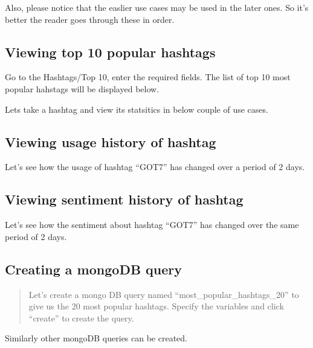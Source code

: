 \documentclass[letterpaper,10pt,english]{sphinxmanual}
\begin{document}
Also, please notice that the easlier use cases may be used in the later ones. So it’s better the reader goes through these in order.


\subsection{Viewing top 10 popular hashtags}
\label{\detokenize{dashboard_website:viewing-top-10-popular-hashtags}}
Go to the Hashtags/Top 10, enter the required fields. The list of top 10 most popular hahstags will be displayed below.

  

Lets take a hashtag and view its statsitics in below couple of use cases.


\subsection{Viewing usage history of  hashtag}
\label{\detokenize{dashboard_website:viewing-usage-history-of-hashtag}}
Let’s see how the usage of hashtag “GOT7” has changed over a period of 2 days.

\noindent{}


\subsection{Viewing sentiment history of  hashtag}
\label{\detokenize{dashboard_website:viewing-sentiment-history-of-hashtag}}
Let’s see how the sentiment about hashtag “GOT7” has changed over the same period of 2 days.

\noindent{}


\subsection{Creating a mongoDB query}
\label{\detokenize{dashboard_website:creating-a-mongodb-query}}\begin{quote}

Let’s create a mongo DB query named “most\_popular\_hashtags\_20” to give us the 20 most popular hashtags. Specify the variables and click “create” to create the query.

\noindent{}
\end{quote}

Similarly other mongoDB queries can be created.
\end{document}
